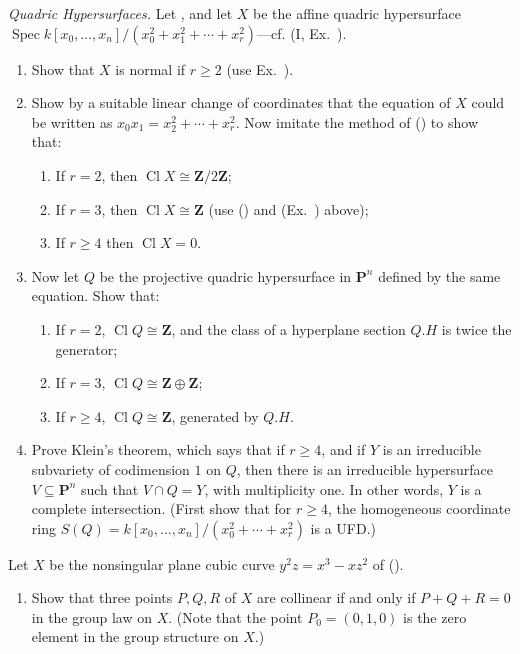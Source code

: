 { \emph{Quadric Hypersurfaces.} Let , and let $X$ be the affine quadric hypersurface $\operatorname{Spec}k[x_0,\ldots,x_n]/(x_0^2+x_1^2+\cdots+x_r^2)$---cf. (I, Ex.\ ).
\begin{enumerate}[label=(\alph*),leftmargin=2.7em,itemsep=0pt,topsep=1pt,parsep=0pt]
\item Show that $X$ is normal if $r\geqslant2$ (use Ex.\ ).
\item Show by a suitable linear change of coordinates that the equation of $X$ could be written as $x_0x_1=x_2^2+\cdots+x_r^2$. Now imitate the method of () to show that:
\begin{enumerate}[label=(\arabic*),leftmargin=2em,itemsep=0pt,topsep=1pt,parsep=0pt]
\item If $r=2$, then $\operatorname{Cl}X\cong\mathbf Z/2\mathbf Z$;
\item If $r=3$, then $\operatorname{Cl}X\cong\mathbf Z$ (use () and (Ex.\ ) above);
\item If $r\geqslant4$ then $\operatorname{Cl}X=0$.
\end{enumerate}
\item Now let $Q$ be the projective quadric hypersurface in $\mathbf P^n$ defined by the same equation. Show that:
\begin{enumerate}[label=(\arabic*),leftmargin=2em,itemsep=0pt,topsep=1pt,parsep=0pt]
\item If $r=2$, $\operatorname{Cl}Q\cong\mathbf Z$, and the class of a hyperplane section $Q.H$ is twice the generator;
\item If $r=3$, $\operatorname{Cl}Q\cong\mathbf Z\oplus\mathbf Z$;
\item If $r\geqslant4$, $\operatorname{Cl}Q\cong\mathbf Z$, generated by $Q.H$.
\end{enumerate}
\item Prove Klein's theorem, which says that if $r\geqslant4$, and if $Y$ is an irreducible subvariety of codimension $1$ on $Q$, then there is an irreducible hypersurface $V\subseteq\mathbf P^n$ such that $V\cap Q=Y$, with multiplicity one. In other words, $Y$ is a complete intersection. (First show that for $r\geqslant4$, the homogeneous coordinate ring $S(Q)=k[x_0,\ldots,x_n]/(x_0^2+\cdots+x_r^2)$ is a UFD.)
\end{enumerate}

 Let $X$ be the nonsingular plane cubic curve $y^2z=x^3-xz^2$ of ().
\begin{enumerate}[label=(\alph*),leftmargin=2.7em,itemsep=0pt,topsep=1pt,parsep=0pt]
\item Show that three points $P,Q,R$ of $X$ are collinear if and only if $P+Q+R=0$ in the group law on $X$. (Note that the point $P_0=(0,1,0)$ is the zero element in the group structure on $X$.)
\end{enumerate}
}
